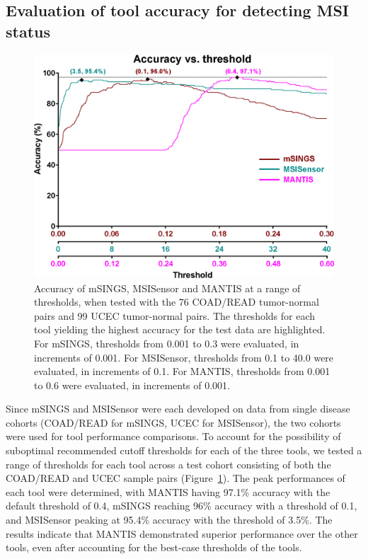 \subsection{Evaluation of tool accuracy for detecting MSI status}
\label{ssec:msilandscape:tool_accuracy}
\begin{figure}[htp]
	\centering
	\includegraphics[width=\linewidth,keepaspectratio]{images/msilandscape/tool_thresholding}
	\caption[Accuracy of mSINGS, MSISensor and MANTIS at a range of thresholds.]{Accuracy of mSINGS, MSISensor and MANTIS at a range of thresholds, when tested with the 76 COAD/READ tumor-normal pairs and 99 UCEC tumor-normal pairs. The thresholds for each tool yielding the highest accuracy for the test data are highlighted. For mSINGS, thresholds from 0.001 to 0.3 were evaluated, in increments of 0.001. For MSISensor, thresholds from 0.1 to 40.0 were evaluated, in increments of 0.1. For MANTIS, thresholds from 0.001 to 0.6 were evaluated, in increments of 0.001.}
	\label{fig:msilandscape:tool_thresholding}
\end{figure}
Since mSINGS and MSISensor were each developed on data from single disease cohorts (COAD/READ for mSINGS, UCEC for MSISensor), the two cohorts were used for tool performance comparisons. To account for the possibility of suboptimal recommended cutoff thresholds for each of the three tools, we tested a range of thresholds for each tool across a test cohort consisting of both the COAD/READ and UCEC sample pairs (Figure~\ref{fig:msilandscape:tool_thresholding}). The peak performances of each tool were determined, with MANTIS having 97.1\% accuracy with the default threshold of 0.4, mSINGS reaching 96\% accuracy with a threshold of 0.1, and MSISensor peaking at 95.4\% accuracy with the threshold of 3.5\%. The results indicate that MANTIS demonstrated superior performance over the other tools, even after accounting for the best-case thresholds of the tools.

